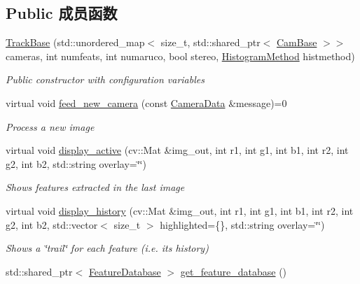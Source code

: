 \subsection*{Public 成员函数}
\begin{DoxyCompactItemize}
\item 
\hyperlink{classov__core_1_1TrackBase_a645127d6e03e66b96959ececccb3ffc0}{Track\+Base} (std\+::unordered\+\_\+map$<$ size\+\_\+t, std\+::shared\+\_\+ptr$<$ \hyperlink{classov__core_1_1CamBase}{Cam\+Base} $>$$>$ cameras, int numfeats, int numaruco, bool stereo, \hyperlink{classov__core_1_1TrackBase_aa4b34a5dce99b59522d57bf9278c9a1a}{Histogram\+Method} histmethod)
\begin{DoxyCompactList}\small\item\em Public constructor with configuration variables \end{DoxyCompactList}\item 
virtual void \hyperlink{classov__core_1_1TrackBase_a18f208f4047e9a1955406806ba68a8c1}{feed\+\_\+new\+\_\+camera} (const \hyperlink{structov__core_1_1CameraData}{Camera\+Data} \&message)=0
\begin{DoxyCompactList}\small\item\em Process a new image \end{DoxyCompactList}\item 
virtual void \hyperlink{classov__core_1_1TrackBase_a01c002a52290030fb86955ed6706f658}{display\+\_\+active} (cv\+::\+Mat \&img\+\_\+out, int r1, int g1, int b1, int r2, int g2, int b2, std\+::string overlay=\char`\"{}\char`\"{})
\begin{DoxyCompactList}\small\item\em Shows features extracted in the last image \end{DoxyCompactList}\item 
virtual void \hyperlink{classov__core_1_1TrackBase_ae90a40ff97cf87e1fe58e278d49c2f5b}{display\+\_\+history} (cv\+::\+Mat \&img\+\_\+out, int r1, int g1, int b1, int r2, int g2, int b2, std\+::vector$<$ size\+\_\+t $>$ highlighted=\{\}, std\+::string overlay=\char`\"{}\char`\"{})
\begin{DoxyCompactList}\small\item\em Shows a \char`\"{}trail\char`\"{} for each feature (i.\+e. its history) \end{DoxyCompactList}\item 
std\+::shared\+\_\+ptr$<$ \hyperlink{classov__core_1_1FeatureDatabase}{Feature\+Database} $>$ \hyperlink{classov__core_1_1TrackBase_aebcef580e2c1639d45bcb74e2bc516aa}{get\+\_\+feature\+\_\+database} ()
$$
\end{DoxyCompactItemize}
